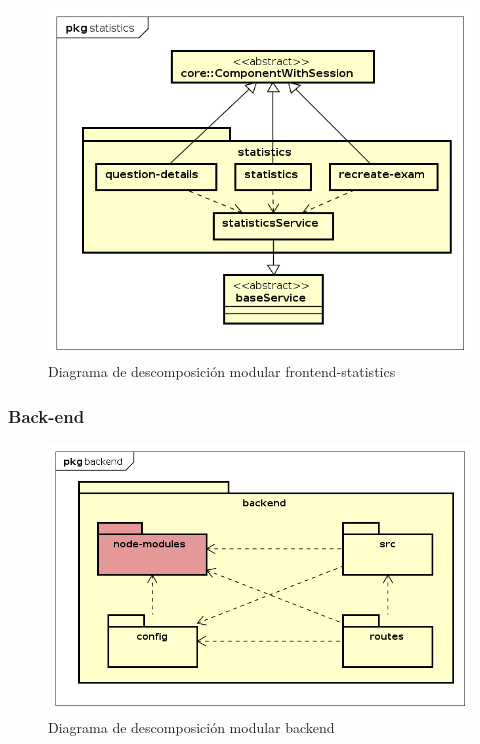 \documentclass[openright,twoside,10pt]{book}
\begin{document}
    \begin{figure}[H]
        \begin{center}
            \includegraphics[width=\textwidth, angle=-90]{img/astah/disenio/descomposicion/front/statistics.png}
        \end{center}
        \caption{Diagrama de descomposición modular frontend-statistics}
    \end{figure}
    
    \vspace*{\fill} \newpage
    
    \subsubsection{Back-end}\label{back-end}
    
    \vspace*{\fill}
    
    \begin{figure}[H]
        \begin{center}
            \includegraphics[width=\textwidth]{img/astah/disenio/descomposicion/back/back.png}
        \end{center}
        \caption{Diagrama de descomposición modular backend}
    \end{figure}
    
\end{document}
